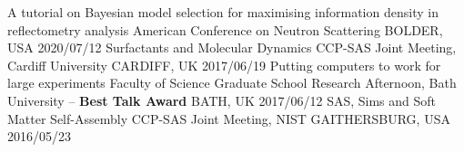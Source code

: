 \vspace{-0.4cm}
\begin{cvhonors}
  \cvhonor
    {A tutorial on Bayesian model selection for maximising information density in reflectometry analysis}
    {American Conference on Neutron Scattering}
    {BOLDER, USA}
    {2020/07/12}
  \cvhonor
    {Surfactants and Molecular Dynamics}
    {CCP-SAS Joint Meeting, Cardiff University}
    {CARDIFF, UK}
    {2017/06/19}
  \cvhonor
  	{Putting computers to work for large experiments}
    {Faculty of Science Graduate School Research Afternoon, Bath University -- \textbf{Best Talk Award}}
    {BATH, UK}
    {2017/06/12}
  \cvhonor
    {SAS, Sims and Soft Matter Self-Assembly}
    {CCP-SAS Joint Meeting, NIST}
    {GAITHERSBURG, USA}
    {2016/05/23}
\end{cvhonors}
